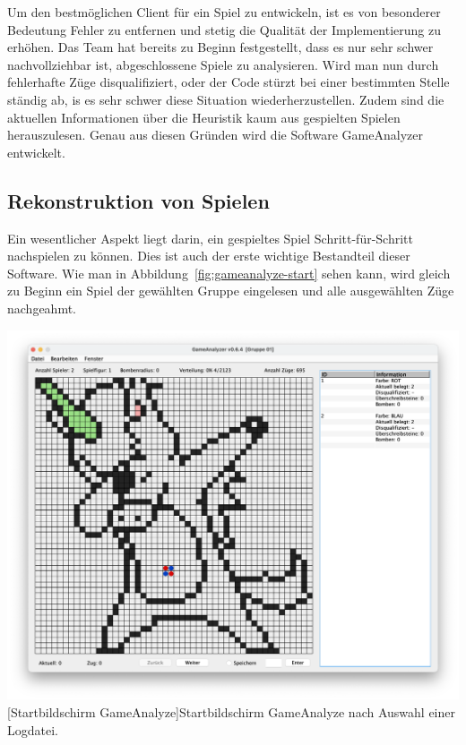 Um den bestm\"oglichen Client f\"ur ein Spiel zu entwickeln, ist es von besonderer Bedeutung Fehler zu entfernen und stetig die Qualit\"at der Implementierung zu erh\"ohen.
Das Team hat bereits zu Beginn festgestellt, dass es nur sehr schwer nachvollziehbar ist, abgeschlossene Spiele zu analysieren.
Wird man nun durch fehlerhafte Z\"uge disqualifiziert, oder der Code st\"urzt bei einer bestimmten Stelle st\"andig ab, is es sehr schwer diese Situation wiederherzustellen.
Zudem sind die aktuellen Informationen \"uber die Heuristik kaum aus gespielten Spielen herauszulesen.
Genau aus diesen Gr\"unden wird die Software GameAnalyzer entwickelt.

\subsection{Rekonstruktion von Spielen}\label{subsec:rekonstruktion-von-spielen}
Ein wesentlicher Aspekt liegt darin, ein gespieltes Spiel Schritt-f\"ur-Schritt nachspielen zu k\"onnen.
Dies ist auch der erste wichtige Bestandteil dieser Software.
Wie man in Abbildung~\ref{fig:gameanalyze-start} sehen kann, wird gleich zu Beginn ein Spiel der gew\"ahlten Gruppe eingelesen und alle ausgew\"ahlten Z\"uge nachgeahmt.

\vspace{1em}
\begin{minipage}{\linewidth}
    \centering
    \includegraphics[width=0.8\linewidth]{pics/startscreen}
    [Startbildschirm GameAnalyze]{Startbildschirm GameAnalyze nach Auswahl einer Logdatei.}
    \label{fig:gameanalyze-start}
\end{minipage}
\vspace{1em}

